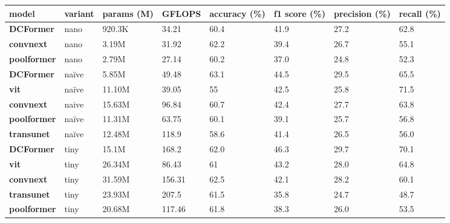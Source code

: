 \begin{table*}[t]
\scriptsize
\renewcommand\arraystretch{1.4}
\begin{center}
\begin{tabular}{|l|l|l|l|l|l|l|l|}
    \hline
        \textbf{model} & \textbf{variant} & \textbf{params (M)} & \textbf{GFLOPS} & \textbf{accuracy (\%)} & \textbf{f1 score (\%)} & \textbf{precision (\%)} & \textbf{recall (\%)} \\ \hline
        \textbf{DCFormer} & nano & 920.3K & 34.21 & 60.4 & 41.9 & 27.2 & 62.8 \\ \hline
        \textbf{convnext} & nano & 3.19M & 31.92 & 62.2 & 39.4 & 26.7 & 55.1 \\ \hline
        \textbf{poolformer} & nano & 2.79M & 27.14 & 60.2 & 37.0 & 24.8 & 52.3 \\ \hline
        \textbf{DCFormer} & naïve & 5.85M & 49.48 & 63.1 & 44.5 & 29.5 & 65.5 \\ \hline
        \textbf{vit} & naïve & 11.10M & 39.05 & 55 & 42.5 & 25.8 & 71.5 \\ \hline
        \textbf{convnext} & naive & 15.63M & 96.84 & 60.7 & 42.4 & 27.7 & 63.8 \\ \hline        
        \textbf{poolformer} & naïve & 11.31M & 63.75 & 60.1 & 39.1 & 25.7 & 56.8 \\ \hline
        \textbf{transunet} & naïve & 12.48M & 118.9 & 58.6 & 41.4 & 26.5 & 56.0 \\ \hline
        \textbf{DCFormer} & tiny & 15.1M & 168.2 & 62.0 & 46.3 & 29.7 & 70.1 \\ \hline
        \textbf{vit} & tiny & 26.34M & 86.43 & 61 & 43.2 & 28.0 & 64.8 \\ \hline
        \textbf{convnext} & tiny & 31.59M & 156.31 & 62.5 & 42.1 & 28.2 & 60.1 \\ \hline
        \textbf{transunet} & tiny & 23.93M & 207.5 & 61.5 & 35.8 & 24.7 & 48.7 \\ \hline
        \textbf{poolformer} & tiny & 20.68M & 117.46 & 61.8 & 38.3 & 26.0 & 53.5 \\ \hline        

\end{tabular}
\end{center}
\end{table*}
